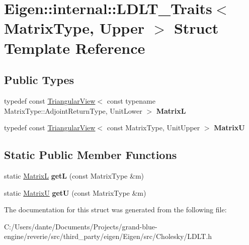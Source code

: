 \hypertarget{struct_eigen_1_1internal_1_1_l_d_l_t___traits_3_01_matrix_type_00_01_upper_01_4}{}\section{Eigen\+::internal\+::L\+D\+L\+T\+\_\+\+Traits$<$ Matrix\+Type, Upper $>$ Struct Template Reference}
\label{struct_eigen_1_1internal_1_1_l_d_l_t___traits_3_01_matrix_type_00_01_upper_01_4}
\subsection*{Public Types}
\begin{DoxyCompactItemize}
\item 
\mbox{\label{struct_eigen_1_1internal_1_1_l_d_l_t___traits_3_01_matrix_type_00_01_upper_01_4_a5b31eeee78528ca777ba86b1a4aab2fb}} 
typedef const \mbox{\hyperlink{class_eigen_1_1_triangular_view}{Triangular\+View}}$<$ const typename Matrix\+Type\+::\+Adjoint\+Return\+Type, Unit\+Lower $>$ {\bfseries MatrixL}
\item 
\mbox{\label{struct_eigen_1_1internal_1_1_l_d_l_t___traits_3_01_matrix_type_00_01_upper_01_4_a97716be1cddf0883c9a3af1779ce7139}} 
typedef const \mbox{\hyperlink{class_eigen_1_1_triangular_view}{Triangular\+View}}$<$ const Matrix\+Type, Unit\+Upper $>$ {\bfseries MatrixU}
\end{DoxyCompactItemize}
\subsection*{Static Public Member Functions}
\begin{DoxyCompactItemize}
\item 
\mbox{\label{struct_eigen_1_1internal_1_1_l_d_l_t___traits_3_01_matrix_type_00_01_upper_01_4_a85ba974cb566d0b44548c47385805951}} 
static \mbox{\hyperlink{class_eigen_1_1_triangular_view}{MatrixL}} {\bfseries getL} (const Matrix\+Type \&m)
\item 
\mbox{\label{struct_eigen_1_1internal_1_1_l_d_l_t___traits_3_01_matrix_type_00_01_upper_01_4_aafa2890ad490dd6697899d0cc19cdeac}} 
static \mbox{\hyperlink{class_eigen_1_1_triangular_view}{MatrixU}} {\bfseries getU} (const Matrix\+Type \&m)
\end{DoxyCompactItemize}


The documentation for this struct was generated from the following file\+:\begin{DoxyCompactItemize}
\item 
C\+:/\+Users/dante/\+Documents/\+Projects/grand-\/blue-\/engine/reverie/src/third\+\_\+party/eigen/\+Eigen/src/\+Cholesky/L\+D\+L\+T.\+h\end{DoxyCompactItemize}
